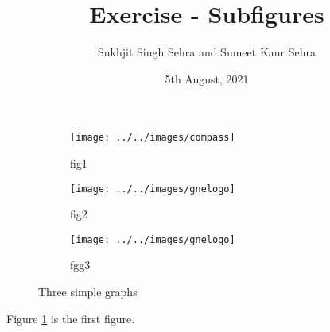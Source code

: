 \documentclass{article}
\title{Exercise  - Subfigures}
\author{Sukhjit Singh Sehra and Sumeet Kaur Sehra}
\date{5th August, 2021}
\begin{document}
	
	\maketitle
	\listoffigures
		\begin{figure}
	\centering
\begin{subfigure}{.3\textwidth}
	\texttt{[image: ../../images/compass]}
		\caption{fig1}
		\label{fig:y equals x}
	\end{subfigure}
\hfill
\begin{subfigure}{.3\textwidth}
	\texttt{[image: ../../images/gnelogo]}
		\caption{fig2}
		\label{fig:three sin x}
	\end{subfigure}
	
	\begin{subfigure}[b]{0.4\textwidth}
			\texttt{[image: ../../images/gnelogo]}
		\caption{fgg3}
		\label{fig:five over x}
	\end{subfigure}
	\caption{Three simple graphs}
	\label{fig:three graphs}
\end{figure}
Figure \ref{fig:y equals x} is the first figure.
\end{document}
